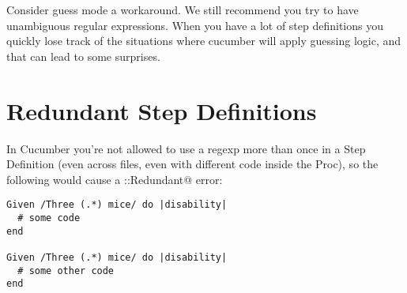 \documentclass[10pt]{book}
\begin{document}
Consider guess mode a workaround. We still recommend you try to have unambiguous regular expressions. When you have a lot of step definitions you quickly lose track of the situations where cucumber will apply guessing logic, and that can lead to some surprises.

\section{Redundant Step Definitions}

In Cucumber you're not allowed to use a regexp more than once in a Step Definition (even across files, even with different code inside the Proc), so the following would cause a \verb@Cucumber::Redundant@ error:

\begin{verbatim}
Given /Three (.*) mice/ do |disability|
  # some code
end

Given /Three (.*) mice/ do |disability|
  # some other code
end

\end{verbatim}
\end{document}
